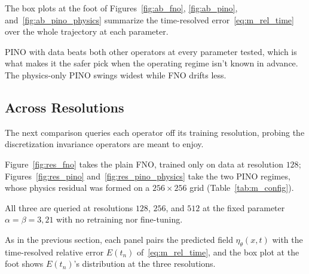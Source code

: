 The box plots at the foot of Figures~\ref{fig:ab_fno}, \ref{fig:ab_pino}, and~\ref{fig:ab_pino_physics} summarize the time-resolved error~\eqref{eq:m_rel_time} over the whole trajectory at each parameter.

PINO with data beats both other operators at every parameter tested, which is what makes it the safer pick when the operating regime isn't known in advance. The physics-only PINO swings widest while FNO drifts less.

\subsection{Across Resolutions}
\label{sec:r_res}

The next comparison queries each operator off its training resolution, probing the discretization invariance operators are meant to enjoy. 

Figure~\ref{fig:res_fno} takes the plain FNO, trained only on data at resolution $128$; Figures~\ref{fig:res_pino} and~\ref{fig:res_pino_physics} take the two PINO regimes, whose physics residual was formed on a $256 \times 256$ grid (Table~\ref{tab:m_config}). 

All three are queried at resolutions $128$, $256$, and $512$ at the fixed parameter $\alpha = \beta = 3{,}21$ with no retraining nor fine-tuning. 

As in the previous section, each panel pairs the predicted field $\eta_\theta(x,t)$ with the time-resolved relative error $E(t_n)$ of~\eqref{eq:m_rel_time}, and the box plot at the foot shows $E(t_n)$'s distribution at the three resolutions.

